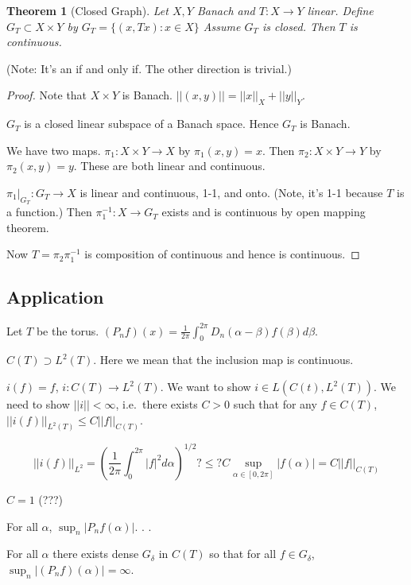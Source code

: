 \documentclass[11pt]{article}
\newtheorem{thm}{Theorem}[section]
\newcommand{\ti}{\times}
\newcommand{\ra}{\rightarrow}
\newcommand{\sbs}{\subset}
\newcommand{\sps}{\supset}
\newcommand{\al}{\alpha}
\newcommand{\be}{\beta}
\newcommand{\de}{\delta}
\newcommand{\fr}[2]{\frac{#1}{#2}}
\begin{document}
\begin{thm}[Closed Graph]
Let $X,Y$ Banach and $T:X\ra Y$ linear. Define $G_T\sbs X\ti Y$ by $G_T=\{(x,Tx): x\in X\}$ Assume $G_T$ is closed. Then $T$ is continuous. 
\end{thm}
(Note: It's an if and only if. The other direction is trivial.) 
\begin{proof}
Note that $X\ti Y$ is Banach. $||(x,y)||=||x||_X+||y||_Y$. 

$G_T$ is a closed linear subspace of a Banach space. Hence $G_T$ is Banach. 

We have two maps. $\pi_1:X\ti Y\ra X$ by $\pi_1(x,y)=x$. Then $\pi_2:X\ti Y\ra Y$ by $\pi_2(x,y)=y$. These are both linear and continuous. 

$\pi_1|_{G_T}:G_T\ra X$ is linear and continuous, 1-1, and onto. (Note, it's 1-1 because $T$ is a function.) Then $\pi_1^{-1}:X\ra G_T$ exists and is continuous by open mapping theorem. 

Now $T=\pi_2\pi_1^{-1}$ is composition of continuous and hence is continuous. 
\end{proof}

\subsection{Application}

Let $T$ be the torus. $(P_nf)(x)=\fr{1}{2\pi}\int_0^{2\pi}D_n(\al-\be)f(\be)d\be$. 

$C(T)\sps L^2(T)$. Here we mean that the inclusion map is continuous. 

$i(f)=f$, $i:C(T)\ra L^2(T)$. We want to show $i\in L(C(t),L^2(T))$. We need to show $||i||<\infty$, i.e.\ there exists $C>0$ such that for any $f\in C(T)$, $||i(f)||_{L^2(T)}\le C||f||_{C(T)}$. 

\[||i(f)||_{L^2}=\left(\fr{1}{2\pi}\int_0^{2\pi}|f|^2d\al\right)^{1/2}?\le? C\sup_{\al\in[0,2\pi]}|f(\al)|=C||f||_{C(T)}\]

$C=1$ (???)

For all $\al$, $\sup_n|P_nf(\al)|$. . .

For all $\al$ there exists dense $G_{\de}$ in $C(T)$ so that for all $f\in G_{\de}$, $\sup_{n}|(P_nf)(\al)|=\infty$. 
\end{document}

